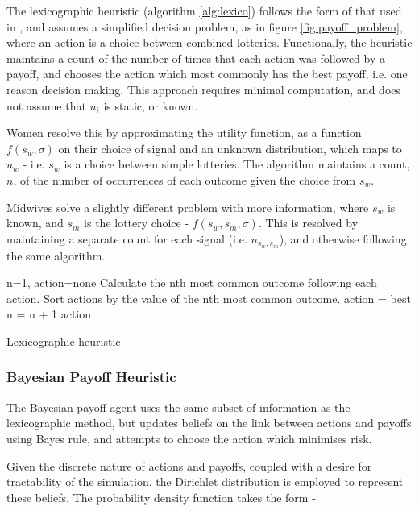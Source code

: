 The lexicographic heuristic (algorithm \ref{alg:lexico}) follows the form of that used in \cite{Hau2008}, and assumes a simplified decision problem, as in figure \ref{fig:payoff_problem}, where an action is a choice between combined lotteries. Functionally, the heuristic maintains a count of the number of times that each action was followed by a payoff, and chooses the action which most commonly has the best payoff, i.e. one reason decision making. This approach requires minimal computation, and does not assume that \(u_{i}\) is static, or known.

Women resolve this by approximating the utility function, as a function \(f(s_{w}, \sigma)\) on their choice of signal and an unknown distribution, which maps to \(u_{w}\) - i.e. \(s_{w}\) is a choice between simple lotteries. The algorithm maintains a count, \(n\), of the number of occurrences of each outcome given the choice from \(s_{w}\).

Midwives solve a slightly different problem with more information, where \(s_{w}\) is known, and \(s_{m}\) is the lottery choice - \(f(s_{w}, s_{m},\sigma)\). This is resolved by maintaining a separate count for each signal (i.e. \(n_{s_{w},s_{m}}\)), and otherwise following the same algorithm.

\begin{algorithm}
\begin{algorithmic}
\State n=1, action=none
\State Calculate the nth most common outcome following each action.
\State Sort actions by the value of the nth most common outcome.
 \State action = best \EndIf
\State n = n + 1
\EndWhile
\State \Return action
\end{algorithmic}
\caption{Lexicographic heuristic\label{alg:lexico}}
\end{algorithm}

\subsubsection{Bayesian Payoff Heuristic}

The Bayesian payoff agent uses the same subset of information as the lexicographic method, but updates beliefs on the link between actions and payoffs using Bayes rule, and attempts to choose the action which minimises risk.

Given the discrete nature of actions and payoffs, coupled with a desire for tractability of the
simulation, the Dirichlet distribution is employed to represent these beliefs. The probability
density function takes the form -

